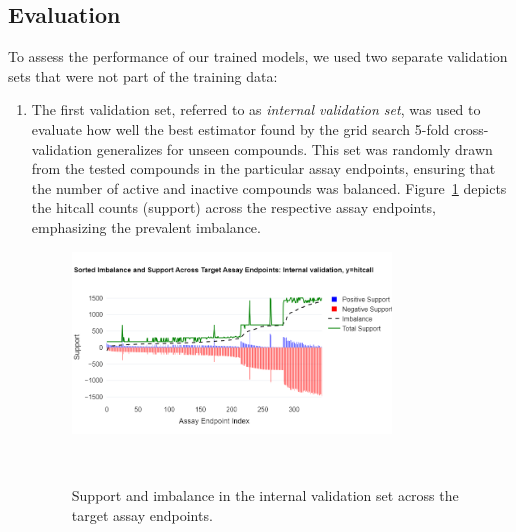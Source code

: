\subsection{Evaluation}
To assess the performance of our trained models, we used two separate validation sets that were not part of the training data:

\begin{enumerate}
    \item The first validation set, referred to as \emph{internal validation set}, was used to evaluate how well the best estimator found by the grid search 5-fold cross-validation generalizes for unseen compounds. This set was randomly drawn from the tested compounds in the particular assay endpoints, ensuring that the number of active and inactive compounds was balanced. Figure~\ref{fig:imbalance_hitcall_val} depicts the hitcall counts (support) across the respective assay endpoints, emphasizing the prevalent imbalance.
    \begin{figure}[h]
        \centering
        \includegraphics[width=0.8\textwidth]{figures/imbalance_hitcall_val.png}
        \caption{Support and imbalance in the internal validation set across the target assay endpoints.}
    ~\label{fig:imbalance_hitcall_val}
    \end{figure}


\end{enumerate}
